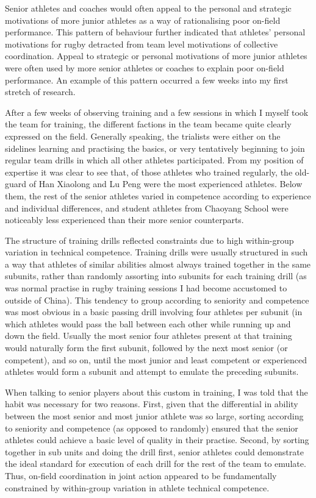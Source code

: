 \begin{CJK}{UTF8}{gbsn}
Senior athletes and coaches would often appeal to the personal and strategic motivations of more junior athletes as a way of rationalising poor on-field performance.  This pattern of behaviour further indicated that athletes' personal motivations for rugby detracted from team level motivations of collective coordination.
Appeal to strategic or personal motivations of more junior athletes were often used by more senior athletes or coaches to explain poor on-field performance.  An example of this pattern occurred a few weeks into my first stretch of research.

After a few weeks of observing training and a few sessions in which I myself took the team for training, the different factions in the team became quite clearly expressed on the field.  Generally speaking, the trialists were either on the sidelines learning and practising the basics, or very tentatively beginning to join regular team drills in which all other athletes participated.  From my position of expertise it was clear to see that, of those athletes who trained regularly, the old-guard of Han Xiaolong and Lu Peng were the most experienced athletes.  Below them, the rest of the senior athletes varied in competence according to experience and individual differences, and student athletes from Chaoyang School were noticeably less experienced than their more senior counterparts.

The structure of training drills reflected constraints due to high within-group variation in technical competence.  Training drills were usually structured in such a way that athletes of similar abilities almost always trained together in the same subunits, rather than randomly assorting into subunits for each training drill (as was normal practise in rugby training sessions I had become accustomed to outside of China).  This tendency to group according to seniority and competence was most obvious in a basic passing drill involving four athletes per subunit (in which athletes would pass the ball between each other while running up and down the field.  Usually the most senior four athletes present at that training would naturally form the first subunit, followed by the next most senior (or competent), and so on, until the most junior and least competent or experienced athletes would form a subunit and attempt to emulate the preceding subunits.

When talking to senior players about this custom in training, I was told that the habit was necessary for two reasons.  First, given that the differential in ability between the most senior and most junior athlete was so large, sorting according to seniority and competence (as opposed to randomly) ensured that the senior athletes could achieve a basic level of quality in their practise.  Second, by sorting together in sub units and doing the drill first, senior athletes could demonstrate the ideal standard for execution of each drill for the rest of the team to emulate.  Thus, on-field coordination in joint action appeared to be fundamentally constrained by within-group variation in athlete technical competence.


\end{CJK}
